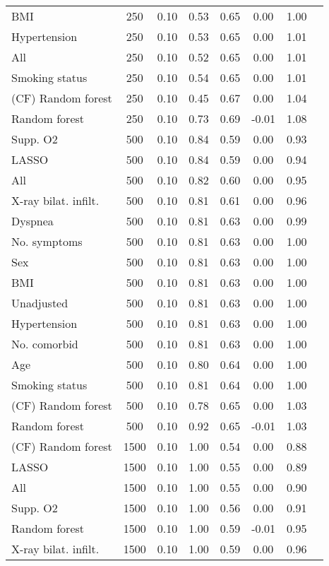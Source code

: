 \documentclass{article}
\begin{document}
{\begin{longtable}{lccccccc}
BMI & 250 & 0.10 & 0.53 & 0.65 &  0.00 & 1.00 \\ 
Hypertension & 250 & 0.10 & 0.53 & 0.65 &  0.00 & 1.01 \\ 
All & 250 & 0.10 & 0.52 & 0.65 &  0.00 & 1.01 \\ 
Smoking status & 250 & 0.10 & 0.54 & 0.65 &  0.00 & 1.01 \\ 
(CF) Random forest & 250 & 0.10 & 0.45 & 0.67 &  0.00 & 1.04 \\ 
Random forest & 250 & 0.10 & 0.73 & 0.69 & -0.01 & 1.08 \\ \midrule() 
Supp. O2 & 500 & 0.10 & 0.84 & 0.59 &  0.00 & 0.93 \\ 
LASSO & 500 & 0.10 & 0.84 & 0.59 &  0.00 & 0.94 \\ 
All & 500 & 0.10 & 0.82 & 0.60 &  0.00 & 0.95 \\ 
X-ray bilat. infilt. & 500 & 0.10 & 0.81 & 0.61 &  0.00 & 0.96 \\ 
Dyspnea & 500 & 0.10 & 0.81 & 0.63 &  0.00 & 0.99 \\ 
No. symptoms & 500 & 0.10 & 0.81 & 0.63 &  0.00 & 1.00 \\ 
Sex & 500 & 0.10 & 0.81 & 0.63 &  0.00 & 1.00 \\ 
BMI & 500 & 0.10 & 0.81 & 0.63 &  0.00 & 1.00 \\ 
Unadjusted & 500 & 0.10 & 0.81 & 0.63 &  0.00 & 1.00 \\ 
Hypertension & 500 & 0.10 & 0.81 & 0.63 &  0.00 & 1.00 \\ 
No. comorbid & 500 & 0.10 & 0.81 & 0.63 &  0.00 & 1.00 \\ 
Age & 500 & 0.10 & 0.80 & 0.64 &  0.00 & 1.00 \\ 
Smoking status & 500 & 0.10 & 0.81 & 0.64 &  0.00 & 1.00 \\ 
(CF) Random forest & 500 & 0.10 & 0.78 & 0.65 &  0.00 & 1.03 \\ 
Random forest & 500 & 0.10 & 0.92 & 0.65 & -0.01 & 1.03 \\ \midrule() 
(CF) Random forest & 1500 & 0.10 & 1.00 & 0.54 &  0.00 & 0.88 \\ 
LASSO & 1500 & 0.10 & 1.00 & 0.55 &  0.00 & 0.89 \\ 
All & 1500 & 0.10 & 1.00 & 0.55 &  0.00 & 0.90 \\ 
Supp. O2 & 1500 & 0.10 & 1.00 & 0.56 &  0.00 & 0.91 \\ 
Random forest & 1500 & 0.10 & 1.00 & 0.59 & -0.01 & 0.95 \\ 
X-ray bilat. infilt. & 1500 & 0.10 & 1.00 & 0.59 &  0.00 & 0.96 \\ 

\end{longtable}}
\end{document}
